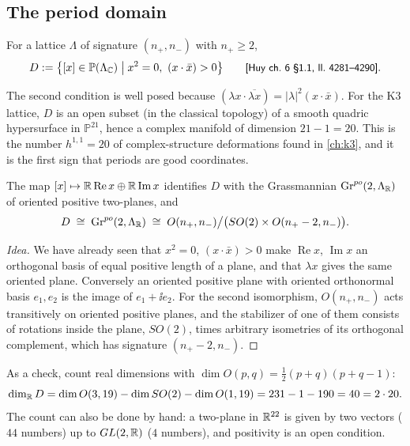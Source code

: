 \subsection{The period domain}
\begin{definition}\label{def:k3lattice:D}
For a lattice $\Lambda$ of signature $(n_+,n_-)$ with $n_+\ge2$,
\begin{equation}\label{eq:k3lattice:D}
 D:=\bigl\{[x]\in\mathbb{P}(\Lambda_{\mathbb{C}})\;\big|\;x^2=0,\ (x\cdot\bar x)>0\bigr\}
 \qquad\text{{\small\textsf{[Huy ch.~6 §1.1, ll.~4281--4290]}}} .
\end{equation}
\end{definition}
The second condition is well posed because $(\lambda x\cdot\overline{\lambda x})
=|\lambda|^2(x\cdot\bar x)$. For the K3 lattice, $D$ is an open subset (in the classical
topology) of a smooth quadric hypersurface in $\mathbb{P}^{21}$, hence a complex manifold of
dimension $21-1=20$. This is the number $h^{1,1}=20$ of complex-structure deformations found
in \cref{ch:k3}, and it is the first sign that periods are good coordinates.

\begin{proposition}\label{prop:k3lattice:grass}
The map $[x]\mapsto\mathbb{R}\operatorname{Re}x\oplus\mathbb{R}\operatorname{Im}x$ identifies $D$ with the
Grassmannian $\mathrm{Gr}^{po}(2,\Lambda_{\mathbb{R}})$ of oriented positive two-planes, and
\begin{equation}\label{eq:k3lattice:homog}
 D\;\cong\;\mathrm{Gr}^{po}(2,\Lambda_{\mathbb{R}})\;\cong\;O(n_+,n_-)\big/\bigl(SO(2)\times
 O(n_+-2,n_-)\bigr) .
\end{equation}
\TL{} 
\end{proposition}
\begin{proof}[Idea]
We have already seen that $x^2=0$, $(x\cdot\bar x)>0$ make $\operatorname{Re}x$,
$\operatorname{Im}x$ an orthogonal basis of equal positive length of a plane, and that
$\lambda x$ gives the same oriented plane. Conversely an oriented positive plane with oriented
orthonormal basis $e_1,e_2$ is the image of $e_1+\ii e_2$. For the second isomorphism,
$O(n_+,n_-)$ acts transitively on oriented positive planes, and the stabilizer of one of them
consists of rotations inside the plane, $SO(2)$, times arbitrary isometries of its orthogonal
complement, which has signature $(n_+-2,n_-)$.
\end{proof}

As a check, count real dimensions with $\dim O(p,q)=\tfrac12(p+q)(p+q-1)$:
\begin{equation}\label{eq:k3lattice:dim40}
 \dim_{\mathbb{R}} D=\dim O(3,19)-\dim SO(2)-\dim O(1,19)=231-1-190=40=2\cdot20 .
\end{equation}
The count can also be done by hand: a two-plane in $\mathbb{R}^{22}$ is given by two vectors ($44$
numbers) up to $GL(2,\mathbb{R})$ ($4$ numbers), and positivity is an open condition.

